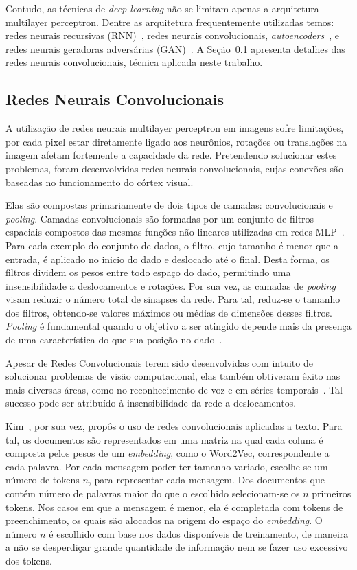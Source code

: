 Contudo, as técnicas de \textit{deep learning} não se limitam apenas a arquitetura multilayer perceptron.
Dentre as arquitetura frequentemente utilizadas temos: redes neurais recursivas (RNN)~\cite{hopfield87}, redes neurais
convolucionais, \textit{autoencoders}~\cite{hinton06_2}, e redes neurais geradoras adversárias
(GAN)~\cite{goodfellow14_2}.
A Seção~\ref{sec:convolucionais} apresenta detalhes das redes neurais convolucionais, técnica aplicada neste trabalho.

\subsection{Redes Neurais Convolucionais} \label{sec:convolucionais}

A utilização de redes neurais multilayer perceptron em imagens sofre limitações, por cada pixel estar diretamente
ligado aos neurônios, rotações ou translações na imagem afetam fortemente a capacidade da rede.
Pretendendo solucionar estes problemas, foram desenvolvidas redes neurais convolucionais, cujas conexões são baseadas
no funcionamento do córtex visual.

Elas são compostas primariamente de dois tipos de camadas: convolucionais e \textit{pooling}.
Camadas convolucionais são formadas por um conjunto de filtros espaciais compostos das mesmas funções não-lineares
utilizadas em redes MLP~\cite{goodfellow16}.
Para cada exemplo do conjunto de dados, o filtro, cujo tamanho é menor que a entrada, é aplicado no inicio do dado e
deslocado até o final.
Desta forma, os filtros dividem os pesos entre todo espaço do dado, permitindo uma insensibilidade a deslocamentos e
rotações.
Por sua vez, as camadas de \textit{pooling} visam reduzir o número total de sinapses da rede.
Para tal, reduz-se o tamanho dos filtros, obtendo-se valores máximos ou médias de dimensões desses filtros.
\textit{Pooling} é fundamental quando o objetivo a ser atingido depende mais da presença de uma característica do que
sua posição no dado~\cite{goodfellow16}.

Apesar de Redes Convolucionais terem sido desenvolvidas com intuito de solucionar problemas de visão computacional, elas
também obtiveram êxito nas mais diversas áreas, como no reconhecimento de voz e em séries temporais~\cite{lecun95}.
Tal sucesso pode ser atribuído à insensibilidade da rede a deslocamentos.

Kim~\cite{kim14}, por sua vez, propôs o uso de redes convolucionais aplicadas a texto.
Para tal, os documentos são representados em uma matriz na qual cada coluna é composta pelos pesos de um
\textit{embedding}, como o Word2Vec, correspondente a cada palavra.
Por cada mensagem poder ter tamanho variado, escolhe-se um número de tokens $n$, para representar cada mensagem.
Dos documentos que contém número de palavras maior do que o escolhido selecionam-se os $n$ primeiros tokens.
Nos casos em que a mensagem é menor, ela é completada com tokens de preenchimento, os quais são alocados na origem do
espaço do \textit{embedding}.
O número $n$ é escolhido com base nos dados disponíveis de treinamento, de maneira a não se desperdiçar grande
quantidade de informação nem se fazer uso excessivo dos tokens.


